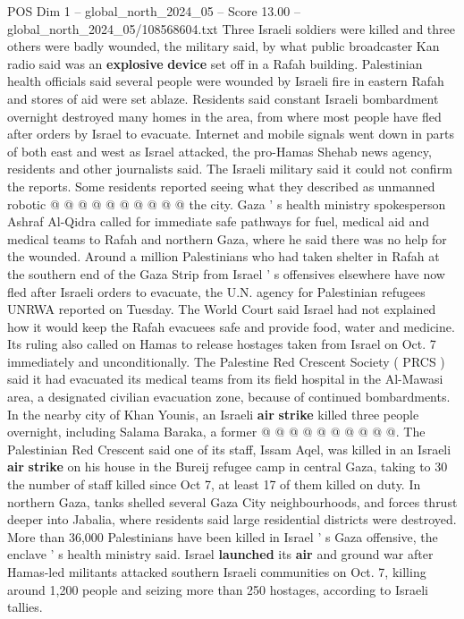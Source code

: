 \begin{textsample}{POS Dim 1 – global\_north\_2024\_05 – Score 13.00 – global\_north\_2024\_05/108568604.txt}
Three Israeli soldiers were killed and three others were badly wounded, the military said, by what public broadcaster Kan radio said was an \textbf{explosive} \textbf{device} set off in a Rafah building.
Palestinian health officials said several people were wounded by Israeli fire in eastern Rafah and stores of aid were set ablaze.
Residents said constant Israeli bombardment overnight destroyed many homes in the area, from where most people have fled after orders by Israel to evacuate.
Internet and mobile signals went down in parts of both east and west as Israel attacked, the pro-Hamas Shehab news agency, residents and other journalists said.
The Israeli military said it could not confirm the reports.
Some residents reported seeing what they described as unmanned robotic @ @ @ @ @ @ @ @ @ @ the city.
Gaza ' s health ministry spokesperson Ashraf Al-Qidra called for immediate safe pathways for fuel, medical aid and medical teams to Rafah and northern Gaza, where he said there was no help for the wounded.
Around a million Palestinians who had taken shelter in Rafah at the southern end of the Gaza Strip from Israel ' s offensives elsewhere have now fled after Israeli orders to evacuate, the U.N. agency for Palestinian refugees UNRWA reported on Tuesday.
The World Court said Israel had not explained how it would keep the Rafah evacuees safe and provide food, water and medicine.
Its ruling also called on Hamas to release hostages taken from Israel on Oct. 7 immediately and unconditionally.
The Palestine Red Crescent Society ( PRCS ) said it had evacuated its medical teams from its field hospital in the Al-Mawasi area, a designated civilian evacuation zone, because of continued bombardments.
In the nearby city of Khan Younis, an Israeli \textbf{air} \textbf{strike} killed three people overnight, including Salama Baraka, a former @ @ @ @ @ @ @ @ @ @.
The Palestinian Red Crescent said one of its staff, Issam Aqel, was killed in an Israeli \textbf{air} \textbf{strike} on his house in the Bureij refugee camp in central Gaza, taking to 30 the number of staff killed since Oct 7, at least 17 of them killed on duty.
In northern Gaza, tanks shelled several Gaza City neighbourhoods, and forces thrust deeper into Jabalia, where residents said large residential districts were destroyed.
More than 36,000 Palestinians have been killed in Israel ' s Gaza offensive, the enclave ' s health ministry said.
Israel \textbf{launched} its \textbf{air} and ground war after Hamas-led militants attacked southern Israeli communities on Oct. 7, killing around 1,200 people and seizing more than 250 hostages, according to Israeli tallies.

\end{textsample}
